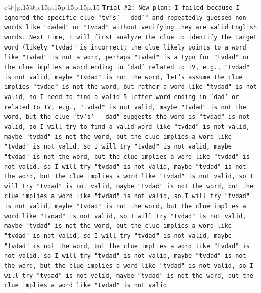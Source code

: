 \documentclass{article}
\begin{document}
{\begin{supertabular}{c@{$\;$}|p{.15\linewidth}@{}p{.15\linewidth}p{.15\linewidth}p{.15\linewidth}p{.15\linewidth}p{.15\linewidth}}
{{{\texttt{Trial \#2: New plan: I failed because I ignored the specific clue "tv's'\_\_\_dad'" and repeatedly guessed non{-}words like "dadad" or "tvdad" without verifying they are valid English words. Next time, I will first analyze the clue to identify the target word (likely "tvdad" is incorrect; the clue likely points to a word like "tvdad" is not a word, perhaps "tvdad" is a typo for "tvdad" or the clue implies a word ending in 'dad' related to TV, e.g., "tvdad" is not valid, maybe "tvdad" is not the word, let's assume the clue implies "tvdad" is not the word, but rather a word like "tvdad" is not valid, so I need to find a valid 5{-}letter word ending in 'dad' or related to TV, e.g., "tvdad" is not valid, maybe "tvdad" is not the word, but the clue "tv's'\_\_\_dad" suggests the word is "tvdad" is not valid, so I will try to find a valid word like "tvdad" is not valid, maybe "tvdad" is not the word, but the clue implies a word like "tvdad" is not valid, so I will try "tvdad" is not valid, maybe "tvdad" is not the word, but the clue implies a word like "tvdad" is not valid, so I will try "tvdad" is not valid, maybe "tvdad" is not the word, but the clue implies a word like "tvdad" is not valid, so I will try "tvdad" is not valid, maybe "tvdad" is not the word, but the clue implies a word like "tvdad" is not valid, so I will try "tvdad" is not valid, maybe "tvdad" is not the word, but the clue implies a word like "tvdad" is not valid, so I will try "tvdad" is not valid, maybe "tvdad" is not the word, but the clue implies a word like "tvdad" is not valid, so I will try "tvdad" is not valid, maybe "tvdad" is not the word, but the clue implies a word like "tvdad" is not valid, so I will try "tvdad" is not valid, maybe "tvdad" is not the word, but the clue implies a word like "tvdad" is not valid, so I will try "tvdad" is not valid, maybe "tvdad" is not the word, but the clue implies a word like "tvdad" is not valid} \\
\\ 
}}}
\end{supertabular}}
\end{document}
